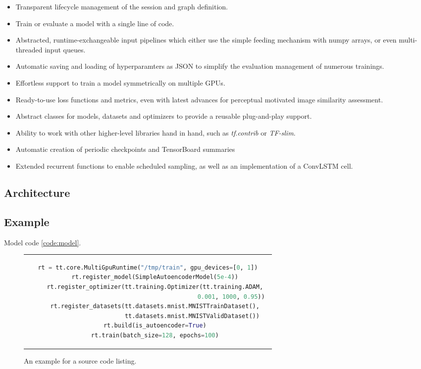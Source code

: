 \begin{itemize}
\item Transparent lifecycle management of the session and graph definition.
\item Train or evaluate a model with a single line of code.
\item Abstracted, runtime-exchangeable input pipelines which either use the simple feeding mechanism with numpy arrays, or even multi-threaded input queues.
\item Automatic saving and loading of hyperparamters as JSON to simplify the evaluation management of numerous trainings.
\item Effortless support to train a model symmetrically on multiple GPUs.
\item Ready-to-use loss functions and metrics, even with latest advances for perceptual motivated image similarity assessment.
\item Abstract classes for models, datasets and optimizers to provide a reusable plug-and-play support.
\item Ability to work with other higher-level libraries hand in hand, such as \textit{tf.contrib} or \textit{TF-slim}.
\item Automatic creation of periodic checkpoints and TensorBoard summaries
\item Extended recurrent functions to enable scheduled sampling, as well as an implementation of a ConvLSTM cell.
\end{itemize}


\subsection{Architecture}


\subsection{Example}


Model code \ref{code:model}.



\begin{figure}[htpb]
  \begin{tabular}{c}
  \begin{lstlisting}[language=Python]
	rt = tt.core.MultiGpuRuntime("/tmp/train", gpu_devices=[0, 1])
	rt.register_model(SimpleAutoencoderModel(5e-4))
	rt.register_optimizer(tt.training.Optimizer(tt.training.ADAM,
	                                            0.001, 1000, 0.95))	
	rt.register_datasets(tt.datasets.mnist.MNISTTrainDataset(),
	                     tt.datasets.mnist.MNISTValidDataset())
	rt.build(is_autoencoder=True)
	rt.train(batch_size=128, epochs=100)
  \end{lstlisting}
  \end{tabular}
  \caption[Example listing]{An example for a source code listing.}\label{code:runtime}
\end{figure}
